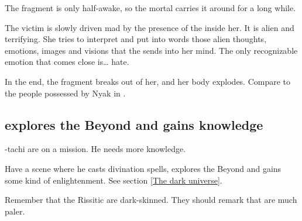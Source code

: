The fragment is only half-awake, so the mortal carries it around for a long while. 

The victim is slowly driven mad by the presence of the \Haskelek{} inside her. 
It is alien and terrifying. 
She tries to interpret and put into words those alien thoughts, emotions, images and visions that the \haskelek{} sends into her mind. 
The only recognizable emotion that comes close is\ldots{} hate. 

In the end, the fragment breaks out of her, and her body explodes. 
Compare to the people possessed by Nyak in . 










\subsection{\Dzasselid{} explores the Beyond and gains knowledge}
\Dzasselid-tachi are on a mission. He needs more knowledge. 

Have a scene where he casts divination spells, explores the Beyond and gains some kind of enlightenment. See section \ref{The dark universe}.


Remember that the Rissitic \humans{} are dark-skinned. 
They should remark that \Velcadian{} \humans{} are much paler. 









